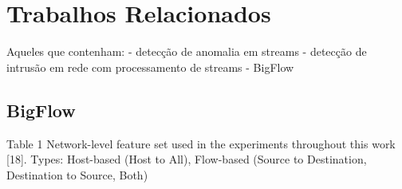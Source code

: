\chapter{Trabalhos Relacionados}

Aqueles que contenham:
    - detecção de anomalia em streams
    - detecção de intrusão em rede com processamento de streams
    - BigFlow


\section{BigFlow}

Table 1
Network-level feature set used in the experiments throughout this work [18].
Types: Host-based (Host to All), Flow-based (Source to Destination, Destination to Source, Both)



